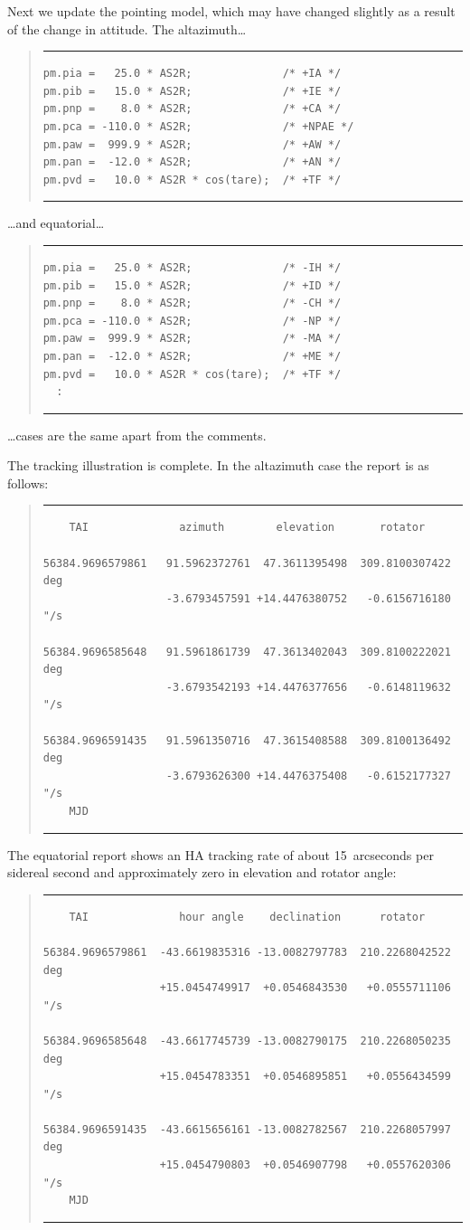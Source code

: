 \documentclass[11pt,fleqn,twoside,\paper]{article}
\renewcommand{\_}{{\tt\char'137}}     %
\newcommand{\scode}     {\goodbreak
                         \begin{quote}
                         \vspace{-6ex}
                         \rule[-2ex]{36em}{0.03ex}}
\newcommand{\ecode}     {\rule[2ex]{36em}{0.03ex}
                         \end{quote}
                         \vspace{-4ex}
                         \goodbreak}
\begin{document}
Next we update the pointing model, which may have changed
slightly as a result of the change in attitude.
The altazimuth\ldots
\scode\begin{verbatim}
pm.pia =   25.0 * AS2R;              /* +IA */
pm.pib =   15.0 * AS2R;              /* +IE */
pm.pnp =    8.0 * AS2R;              /* +CA */
pm.pca = -110.0 * AS2R;              /* +NPAE */
pm.paw =  999.9 * AS2R;              /* +AW */
pm.pan =  -12.0 * AS2R;              /* +AN */
pm.pvd =   10.0 * AS2R * cos(tare);  /* +TF */
\end{verbatim}\ecode
\ldots and equatorial\ldots
\scode\begin{verbatim}
pm.pia =   25.0 * AS2R;              /* -IH */
pm.pib =   15.0 * AS2R;              /* +ID */
pm.pnp =    8.0 * AS2R;              /* -CH */
pm.pca = -110.0 * AS2R;              /* -NP */
pm.paw =  999.9 * AS2R;              /* -MA */
pm.pan =  -12.0 * AS2R;              /* +ME */
pm.pvd =   10.0 * AS2R * cos(tare);  /* +TF */
  :
\end{verbatim}\ecode
\ldots cases are the same apart from the comments.

The tracking illustration is complete.  In the altazimuth case the
report is as follows:
\scode\begin{verbatim}
    TAI              azimuth        elevation       rotator

56384.9696579861   91.5962372761  47.3611395498  309.8100307422  deg
                   -3.6793457591 +14.4476380752   -0.6156716180  "/s

56384.9696585648   91.5961861739  47.3613402043  309.8100222021  deg
                   -3.6793542193 +14.4476377656   -0.6148119632  "/s

56384.9696591435   91.5961350716  47.3615408588  309.8100136492  deg
                   -3.6793626300 +14.4476375408   -0.6152177327  "/s
    MJD
\end{verbatim}\ecode
The equatorial report shows an HA tracking rate of about 15~arcseconds
per sidereal second and approximately zero in elevation and rotator
angle:
\scode\begin{verbatim}
    TAI              hour angle    declination      rotator

56384.9696579861  -43.6619835316 -13.0082797783  210.2268042522  deg
                  +15.0454749917  +0.0546843530   +0.0555711106  "/s

56384.9696585648  -43.6617745739 -13.0082790175  210.2268050235  deg
                  +15.0454783351  +0.0546895851   +0.0556434599  "/s

56384.9696591435  -43.6615656161 -13.0082782567  210.2268057997  deg
                  +15.0454790803  +0.0546907798   +0.0557620306  "/s
    MJD
\end{verbatim}\ecode
\end{document}
